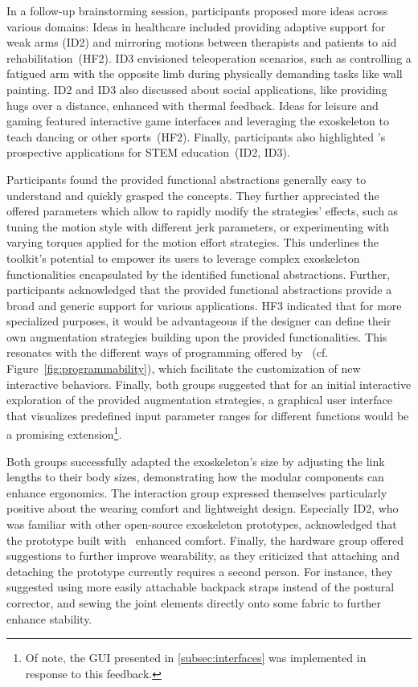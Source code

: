 In a follow-up brainstorming session, participants proposed more ideas across various domains: Ideas in healthcare included providing adaptive support for weak arms (ID2) and mirroring motions between therapists and patients to aid rehabilitation~(HF2). ID3 envisioned teleoperation scenarios, such as controlling a fatigued arm with the opposite limb during physically demanding tasks like wall painting. ID2 and ID3 also discussed about social applications, like providing hugs over a distance, enhanced with thermal feedback. Ideas for leisure and gaming featured interactive game interfaces and leveraging the exoskeleton to teach dancing or other sports~(HF2). Finally, participants also highlighted \toolkit’s prospective applications for STEM education~(ID2, ID3).

Participants found the provided functional abstractions generally easy to understand and quickly grasped the concepts. They further appreciated the offered parameters which allow to rapidly modify the strategies' effects, such as tuning the motion style with different jerk parameters, or experimenting with varying torques applied for the motion effort strategies. This underlines the toolkit's potential to empower its users to leverage complex exoskeleton functionalities encapsulated by the identified functional abstractions. 
Further, participants acknowledged that the provided functional abstractions provide a broad and generic support for various applications. HF3 indicated that for more specialized purposes, it would be advantageous if the designer can define their own augmentation strategies building upon the provided functionalities. This resonates with the different ways of programming offered by \toolkit~(cf. Figure~\ref{fig:programmability}), which facilitate the customization of new interactive behaviors. 
Finally, both groups suggested that for an initial interactive exploration of the provided augmentation strategies, a graphical user interface that visualizes predefined input parameter ranges for different functions would be a promising extension\footnote{Of note, the GUI presented in \autoref{subsec:interfaces} was implemented in response to this feedback.}.


Both groups successfully adapted the exoskeleton’s size by adjusting the link lengths to their body sizes, demonstrating how the modular components can enhance ergonomics. The interaction group expressed themselves particularly positive about the wearing comfort and lightweight design. Especially ID2, who was familiar with other open-source exoskeleton prototypes, acknowledged that the prototype built with \toolkit~enhanced comfort. Finally, the hardware group offered suggestions to further improve wearability, as they criticized that attaching and detaching the prototype currently requires a second person. For instance, they suggested using more easily attachable backpack straps instead of the postural corrector, and sewing the joint elements directly onto some fabric to further enhance stability.


